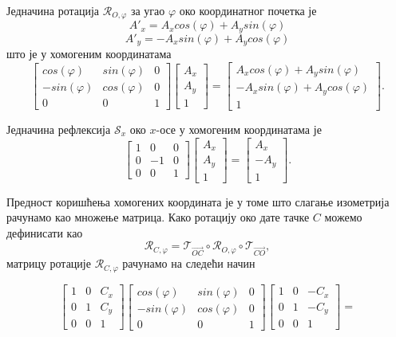 \documentclass[12pt]{article}
\begin{document}
Једначина ротација $\mathcal{R}_{O,\varphi}$ за угао $\varphi$ око координатног почетка  је $$A'_x = A_x  cos(\varphi) +  A_y  sin(\varphi)$$ 
$$A'_y = -A_x  sin(\varphi) + A_y  cos(\varphi)$$
што је у хомогеним координатама
\[\begin{bmatrix}cos(\varphi) & sin(\varphi) & 0\\ -sin(\varphi) & cos(\varphi)&0 \\ 0 & 0 & 1\end{bmatrix} \begin{bmatrix}A_x\\ A_y\\1\end{bmatrix} = 
\begin{bmatrix}A_x  cos(\varphi) +  A_y  sin(\varphi)\\ -A_x  sin(\varphi) + A_y  cos(\varphi)\\1\end{bmatrix}.\]

Једначина рефлексија $\mathcal{S}_x$ око $x$-осе   у хомогеним координатама је
\[\begin{bmatrix}1 & 0 & 0\\ 0 & -1&0 \\ 0 & 0 & 1\end{bmatrix} \begin{bmatrix}A_x\\ A_y\\1\end{bmatrix} = 
\begin{bmatrix}A_x \\ -A_y\\1\end{bmatrix}.\]

Предност  коришћења  хомогених  координата  је  у  томе  што  слагање  изометрија  рачунамо  као множење матрица. Како ротацију око дате тачке $C$ можемо дефинисати као
$$\mathcal{R}_{C,\varphi} = \mathcal{T}_{\overrightarrow{OC}} \circ \mathcal{R}_{O,\varphi} \circ \mathcal{T}_{\overrightarrow{CO}},$$
матрицу ротације $\mathcal{R}_{C,\varphi}$ рачунамо на следећи начин 

\[\begin{bmatrix}1 & 0 & C_x\\ 0 & 1&C_y \\ 0 & 0 & 1\end{bmatrix}
\begin{bmatrix}cos(\varphi) & sin(\varphi) & 0\\ -sin(\varphi) & cos(\varphi)&0 \\ 0 & 0 & 1\end{bmatrix}
\begin{bmatrix}1 & 0 & -C_x\\ 0 & 1&-C_y \\ 0 & 0 & 1\end{bmatrix}
=  \]
\end{document}
